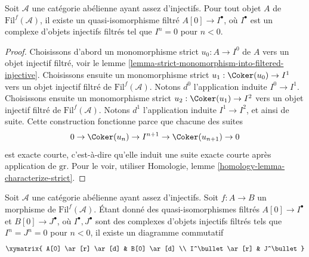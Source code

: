 \begin{lemma}
\label{lemma-filtered-injective-right-resolution-single-object}
Soit $\mathcal{A}$ une catégorie abélienne ayant assez d'injectifs.
Pour tout objet $A$ de $\text{Fil}^f(\mathcal{A})$, il existe un
quasi-isomorphisme filtré $A[0] \to I^\bullet$, où $I^\bullet$ est un complexe
d'objets injectifs filtrés tel que $I^n = 0$ pour $n < 0$.
\end{lemma}

\begin{proof}
Choisissons d'abord un monomorphisme strict
$u_0 : A \to I^0$ de $A$ vers un objet injectif filtré, voir le
lemme \ref{lemma-strict-monomorphism-into-filtered-injective}.
Choisissons ensuite un monomorphisme strict
$u_1 : \Coker(u_0) \to I^1$ vers un objet injectif filtré de
$\text{Fil}^f(\mathcal{A})$. Notons $d^0$ l'application induite
$I^0 \to I^1$.
Choisissons ensuite un monomorphisme strict
$u_2 : \Coker(u_1) \to I^2$ vers un objet injectif filtré de
$\text{Fil}^f(\mathcal{A})$. Notons $d^1$ l'application induite
$I^1 \to I^2$, et ainsi de suite. Cette construction fonctionne parce que
chacune des suites
$$
0 \to \Coker(u_n) \to I^{n + 1} \to \Coker(u_{n + 1}) \to 0
$$
est exacte courte, c'est-à-dire qu'elle induit une suite exacte courte après
application de $\text{gr}$. Pour le voir, utiliser Homologie, lemme
\ref{homology-lemma-characterize-strict}.
\end{proof}

\begin{lemma}
\label{lemma-filtered-injective-right-resolution-map}
Soit $\mathcal{A}$ une catégorie abélienne ayant assez d'injectifs.
Soit $f : A \to B$ un morphisme de $\text{Fil}^f(\mathcal{A})$.
Étant donné des quasi-isomorphismes filtrés
$A[0] \to I^\bullet$ et $B[0] \to J^\bullet$, où
$I^\bullet, J^\bullet$ sont des complexes d'objets injectifs filtrés tels que
$I^n = J^n = 0$ pour $n < 0$, il existe un diagramme commutatif
$$
\xymatrix{
A[0] \ar[r] \ar[d] &
B[0] \ar[d] \\
I^\bullet \ar[r] &
J^\bullet
}
$$
\end{lemma}

